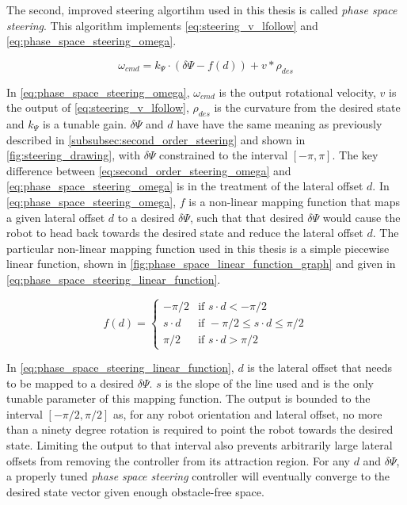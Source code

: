The second, improved steering algortihm used in this thesis is called \emph{phase space steering}. This algorithm implements \eqref{eq:steering_v_lfollow} and \eqref{eq:phase_space_steering_omega}.

\begin{equation}
\omega_{cmd} = k_\Psi \cdot \left( \delta\Psi - f\left( d \right) \right) + v * \rho_{des}
\label{eq:phase_space_steering_omega}
\end{equation}

In \eqref{eq:phase_space_steering_omega}, $\omega_{cmd}$ is the output rotational velocity, $v$ is the output of \eqref{eq:steering_v_lfollow}, $\rho_{des}$ is the curvature from the desired state and $k_{\Psi}$ is a tunable gain. $\delta\Psi$ and $d$ have have the same meaning as previously described in \autoref{subsubsec:second_order_steering} and shown in \autoref{fig:steering_drawing}, with $\delta\Psi$ constrained to the interval $\left[-\pi,\pi\right]$. The key difference between \eqref{eq:second_order_steering_omega} and \eqref{eq:phase_space_steering_omega} is in the treatment of the lateral offset $d$. In \eqref{eq:phase_space_steering_omega}, $f$ is a non-linear mapping function that maps a given lateral offset $d$ to a desired $\delta\Psi$, such that that desired $\delta\Psi$ would cause the robot to head back towards the desired state and reduce the lateral offset $d$. The particular non-linear mapping function used in this thesis is a simple piecewise linear function, shown in \autoref{fig:phase_space_linear_function_graph} and given in \eqref{eq:phase_space_steering_linear_function}.

\begin{equation}
f\left( d \right) =
	\begin{cases}
		-\pi/2 & \text{if } s \cdot d < -\pi/2 \\
		s \cdot d & \text{if } -\pi/2 \leq s \cdot d \leq \pi/2 \\
		\pi/2 & \text{if } s \cdot d > \pi/2
	\end{cases}
	\label{eq:phase_space_steering_linear_function}
\end{equation}

In \eqref{eq:phase_space_steering_linear_function}, $d$ is the lateral offset that needs to be mapped to a desired $\delta\Psi$. $s$ is the slope of the line used and is the only tunable parameter of this mapping function. The output is bounded to the interval $\left[-\pi/2,\pi/2\right]$ as, for any robot orientation and lateral offset, no more than a ninety degree rotation is required to point the robot towards the desired state. Limiting the output to that interval also prevents arbitrarily large lateral offsets from removing the controller from its attraction region. For any $d$ and $\delta\Psi$, a properly tuned \emph{phase space steering} controller will eventually converge to the desired state vector given enough obstacle-free space.


